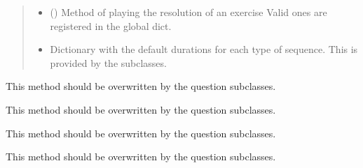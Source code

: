 \documentclass[letterpaper,10pt,english]{sphinxmanual}
\begin{document}
\begin{fulllineitems}
\begin{fulllineitems}
\begin{quote}
\begin{description}
\begin{itemize}
\item {} 
 () \textendash{} Method of playing the resolution of an
exercise Valid ones are registered in the
 global dict.

\item {} 
 \textendash{} Dictionary with the default durations for
each type of sequence. This is provided by the subclasses.

\end{itemize}

\end{description}\end{quote}

\end{fulllineitems}


\begin{fulllineitems}
\label{\detokenize{birdears:birdears.questionbase.QuestionBase.check_question}}
This method should be overwritten by the question subclasses.

\end{fulllineitems}


\begin{fulllineitems}
\label{\detokenize{birdears:birdears.questionbase.QuestionBase.make_question}}
This method should be overwritten by the question subclasses.

\end{fulllineitems}


\begin{fulllineitems}
\label{\detokenize{birdears:birdears.questionbase.QuestionBase.make_resolution}}
This method should be overwritten by the question subclasses.

\end{fulllineitems}


\begin{fulllineitems}
\label{\detokenize{birdears:birdears.questionbase.QuestionBase.play_question}}
This method should be overwritten by the question subclasses.

\end{fulllineitems}


\end{fulllineitems}
\end{document}
